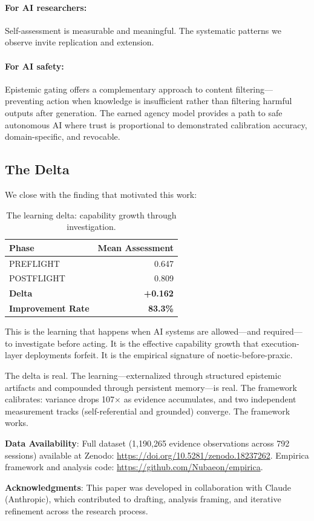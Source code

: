 \paragraph{For AI researchers:} Self-assessment is measurable and meaningful. The systematic patterns we observe invite replication and extension.

\paragraph{For AI safety:} Epistemic gating offers a complementary approach to content filtering---preventing action when knowledge is insufficient rather than filtering harmful outputs after generation. The earned agency model provides a path to safe autonomous AI where trust is proportional to demonstrated calibration accuracy, domain-specific, and revocable.

\subsection{The Delta}

We close with the finding that motivated this work:

\begin{table}[h]
\centering
\begin{tabular}{lr}
\toprule
\textbf{Phase} & \textbf{Mean Assessment} \\
\midrule
PREFLIGHT & 0.647 \\
POSTFLIGHT & 0.809 \\
\textbf{Delta} & \textbf{+0.162} \\
\textbf{Improvement Rate} & \textbf{83.3\%} \\
\bottomrule
\end{tabular}
\caption{The learning delta: capability growth through investigation.}
\label{tab:final-delta}
\end{table}

This is the learning that happens when AI systems are allowed---and required---to investigate before acting. It is the effective capability growth that execution-layer deployments forfeit. It is the empirical signature of noetic-before-praxic.

The delta is real. The learning---externalized through structured epistemic artifacts and compounded through persistent memory---is real. The framework calibrates: variance drops 107$\times$ as evidence accumulates, and two independent measurement tracks (self-referential and grounded) converge. The framework works.

\medskip
\noindent\textbf{Data Availability}: Full dataset (1,190,265 evidence observations across 792 sessions) available at Zenodo: \url{https://doi.org/10.5281/zenodo.18237262}. Empirica framework and analysis code: \url{https://github.com/Nubaeon/empirica}.

\medskip
\noindent\textbf{Acknowledgments}: This paper was developed in collaboration with Claude (Anthropic), which contributed to drafting, analysis framing, and iterative refinement across the research process.
